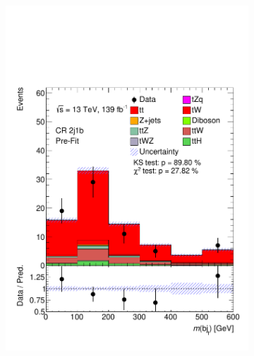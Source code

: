 \begin{figure}[h!]
\begin{subfigure}[b]{0.33\linewidth}
    \includegraphics[width=\linewidth]{ubonn-thesis/Chapters/Chapters_05/Figure/CR_tt/CR_2j1b_M_bj.pdf} 
  \end{subfigure}%
  \begin{subfigure}[b]{0.33\linewidth}
    \centering

\end{subfigure}
\end{figure}
